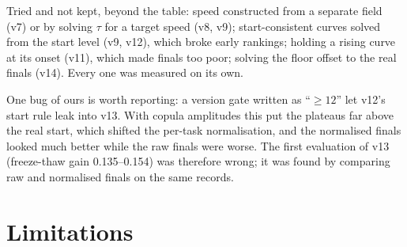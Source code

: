 \documentclass[10pt]{article}
\newcommand{\bpl}{\textsf{bpl}}
\begin{document}
Tried and not kept, beyond the table: speed constructed from a separate field (v7) or by solving $\tau$ for a target
speed (v8, v9); start-consistent curves solved from the start level (v9, v12), which broke early rankings; holding a
rising curve at its onset (v11), which made finals too poor; solving the floor offset to the real finals (v14).
Every one was measured on its own.

One bug of ours is worth reporting: a version gate written as ``$\ge 12$'' let v12's start rule leak into v13. With
copula amplitudes this put the plateaus far above the real start, which shifted the per-task normalisation, and the
normalised finals looked much better while the raw finals were worse. The first evaluation of v13 (freeze-thaw gain
0.135--0.154) was therefore wrong; it was found by comparing raw and normalised finals on the same records.

\begin{table}[t]
  \centering
  \scriptsize
  \caption{Development of \bpl{} on the select split, one change per version (``kept'': whether the change is in
  the final model). Time to 90\%: log budget fraction; speed $R^2$ and $\rho_{200}$: landscape statistics (closer
  to real is better). Gains: Hyperband (HB) and freeze-thaw (FT) over random search; $^*$ mean of three generation
  seeds, otherwise one (standard error about 0.01).}
  \label{tab:dev}
  
\end{table}

\section{Limitations}
\end{document}
